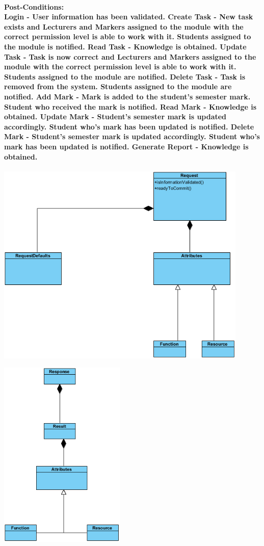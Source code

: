\documentclass[12pt]{article}
\begin{document}
 \paragraph*{Post-Conditions: \\ Login - User information has been validated.
 Create Task - New task exists and Lecturers and Markers assigned to the module with the correct permission level is able to work with it. Students assigned to the module is notified.
 Read Task - Knowledge is obtained.
 Update Task - Task is now correct and Lecturers and Markers assigned to the module with the correct permission level is able to work with it. Students assigned to the module are notified.
 Delete Task - Task is removed from the system. Students assigned to the module are notified.
 Add Mark - Mark is added to the student's semester mark. Student who received the mark is notified.
 Read Mark - Knowledge is obtained.
 Update Mark - Student's semester mark is updated accordingly. Student who's mark has been updated is notified.
 Delete Mark - Student's semester mark is updated accordingly. Student who's mark has been updated is notified.
 Generate Report - Knowledge is obtained.}
 \begin{center}
  \includegraphics[width=120mm]{Diagram1.png}  
  \end{center}
  \begin{center}
  \advance\leftskip-2.0cm
  \includegraphics[width=60mm]{Diagram2.png}  
  \end{center}
\end{document}
